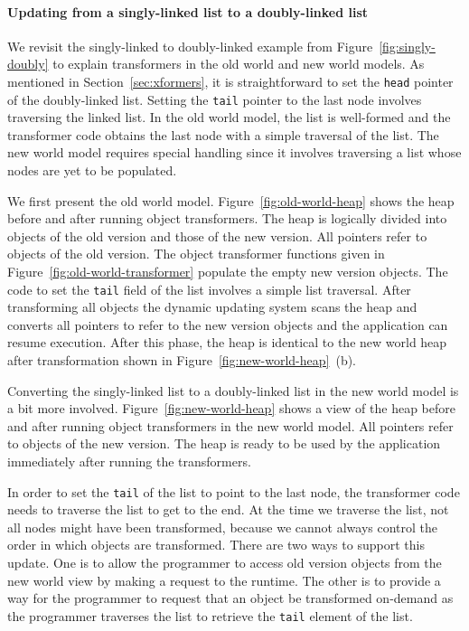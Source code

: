 

\paragraph{Updating from a singly-linked list to a doubly-linked list}

We revisit the singly-linked to doubly-linked example from
Figure~\ref{fig:singly-doubly} to explain transformers in the old world and
new world models.  As mentioned in Section~\ref{sec:xformers}, it is
straightforward to set the {\tt head} pointer of the doubly-linked list.
Setting the {\tt tail} pointer to the last node involves traversing the
linked list. In the old world model, the list is well-formed and the
transformer code obtains the last node with a simple traversal of the list.
The new world model requires special handling since it involves traversing
a list whose nodes are yet to be populated.

We first present the old world model. Figure~\ref{fig:old-world-heap} shows
the heap before and after running object transformers. The heap
is logically divided into objects of the old version and those of the new
version. All pointers refer to objects of the old version. The object
transformer functions given in Figure~\ref{fig:old-world-transformer}
populate the empty new version objects. The code to set the {\tt tail}
field of the list involves a simple list traversal. After transforming all
objects the dynamic updating system scans the heap and converts all
pointers to refer to the new version objects and the application can resume
execution. After this phase, the heap is identical to the new world heap
after transformation shown in Figure~\ref{fig:new-world-heap}~(b).

Converting the singly-linked list to a doubly-linked list in the new world
model is a bit more involved. Figure~\ref{fig:new-world-heap} shows a view
of the heap before and after running object transformers in the new world
model. All pointers refer to objects of the new version. The heap is ready
to be used by the application immediately after running the transformers.




In order to set the {\tt tail} of the list to point to the last node, the
transformer code needs to traverse the list to get to the end. At the time
we traverse the list, not all nodes might have been transformed, because we
cannot always control the order in which objects are transformed. There are two
ways to support this update. One is to allow the programmer to access old
version objects from the new world view by making a request to the runtime.
The other is to provide a way for the programmer to request that an object
be transformed on-demand as the programmer traverses the list to retrieve
the {\tt tail} element of the list.


